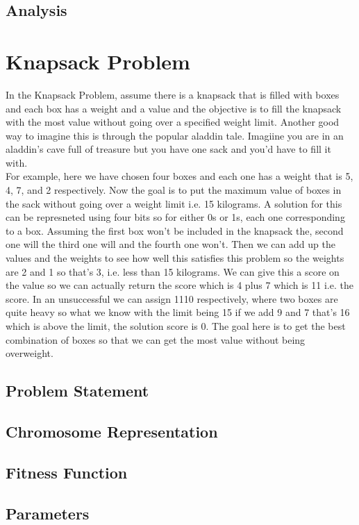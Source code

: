 \documentclass[11pt, letterpaper]{article}
\begin{document}
\subsection{Analysis}

\section{Knapsack Problem}
In the Knapsack Problem, assume there is a knapsack that is  filled with boxes and each box has a weight and a value and the objective is to fill the knapsack with the most value without going over a specified weight limit. Another good way to imagine this is through the popular aladdin tale. Imagiine you are in an aladdin's cave full of treasure but you have
one sack and you'd have to fill it with.\\
For example, here we have chosen four boxes and each one has a weight that is 5, 4, 7, and 2 respectively. Now the goal is to put the maximum value of boxes in the sack without going
over a weight limit i.e. 15 kilograms. A solution for this can be represneted using four bits so for either 0s or
1s, each one corresponding to a box. Assuming the first box
won't be included in the knapsack the, second one will the third one will and the fourth one won't. Then we can add up the values and the weights to see how well this satisfies this problem so the weights are 2 and 1 so that's 3, i.e. less than 15 kilograms. We can give this a score on the
value so we can actually return the score which is 4 plus 7 which is 11 i.e. the score. In an unsuccessful we can assign 1110 respectively, where two boxes are quite heavy
so what we know with the limit being 15 if we add 9 and 7
that's 16 which is above the limit, the solution score is 0. The goal here is to get the best combination of boxes so that we can get the most value without being overweight.
\subsection{Problem Statement}
\subsection{Chromosome Representation}
\subsection{Fitness Function}
\subsection{Parameters}
\end{document}
